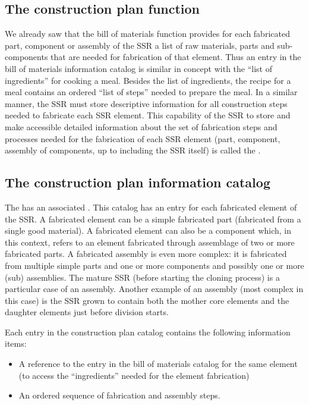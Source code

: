\subsection[The construction plan function]{The construction plan
function}

We already saw that the bill of
materials function provides for each fabricated part, component or
assembly of the SSR a list of raw materials, parts and sub-components
that are needed for fabrication of that element. Thus an entry in the
bill of materials information catalog is similar in concept with the
“list of ingredients” for cooking a meal. Besides the list of
ingredients, the recipe for a meal contains an ordered “list of steps”
needed to prepare the meal. In a similar manner, the SSR must store
descriptive information for all construction steps needed to fabricate
each SSR element. This capability of the SSR to store and make
accessible detailed information about the set of fabrication steps and
processes needed for the fabrication of each SSR element (part,
component, assembly of components, up to including the SSR itself) is
called the .

\subsection[The construction plan information catalog]{The construction
plan information catalog}

The  has an associated . 
This catalog has an entry for each fabricated element of the
SSR. A fabricated element can be a simple fabricated part (fabricated
from a single good material). A fabricated element can also be a
component which, in this context, refers to an element fabricated
through assemblage of two or more fabricated parts. A fabricated
assembly is even more complex: it is fabricated from multiple simple
parts and one or more components and possibly one or more (sub)
assemblies. The mature SSR (before starting the cloning process) is a
particular case of an assembly. Another example of an assembly (most
complex in this case) is the SSR grown to contain both the mother core
elements and the daughter elements just before division starts. 

Each entry in the construction plan catalog contains the following
information items:

\begin{itemize}
\item A reference to the entry in the bill of materials catalog for the
same element (to access the “ingredients” needed for the element
fabrication)
\item An ordered sequence of fabrication and assembly steps.
\end{itemize}

